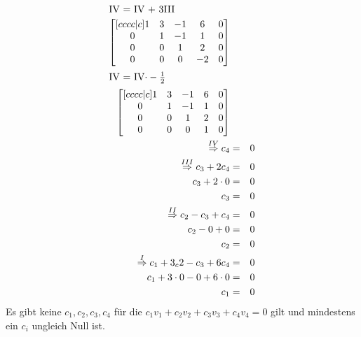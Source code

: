 \documentclass[10pt,a4paper,oneside,ngerman,numbers=noenddot]{scrartcl}
\begin{document}
\begin{alignat*}{2}
\intertext{IV = IV + 3III}
\begin{bmatrix}[cccc|c]
1 & 3 & -1 & 6 & 0 \\
0 & 1 & -1 & 1 & 0 \\
0 & 0 & 1 & 2 & 0 \\
0 & 0 & 0 & -2 & 0
\end{bmatrix} \\
\intertext{IV = IV$ \cdot -\frac{1}{2}$}
\begin{bmatrix}[cccc|c]
1 & 3 & -1 & 6 & 0 \\
0 & 1 & -1 & 1 & 0 \\
0 & 0 & 1 & 2 & 0 \\
0 & 0 & 0 & 1 & 0
\end{bmatrix} \\
\overset{IV}{\Rightarrow} c_{4} &=& 0 \\
\overset{III}{\Rightarrow} c_{3} + 2c_{4} &=& 0 \\
c_{3} + 2 \cdot 0 &=& 0 \\
c_{3} &=& 0 \\
\overset{II}{\Rightarrow} c_{2} - c_{3} + c_{4} &=& 0 \\
c_{2} - 0 + 0 &=& 0 \\
c_{2} &=& 0 \\
\overset{I}{\Rightarrow} c_{1} + 3_c{2} - c_{3} + 6c_{4} &=& 0 \\
c_{1} + 3 \cdot 0 - 0 + 6 \cdot 0 &=& 0 \\
c_{1} &=& 0
\end{alignat*}
Es gibt keine $c_{1}, c_{2}, c_{3}, c_{4}$ für die $c_{1}v_{1} + c_{2}v_{2} + c_{3}v_{3} + c_{4}v_{4} = 0$ gilt und mindestens ein $c_{i}$ ungleich Null ist.
\end{document}
